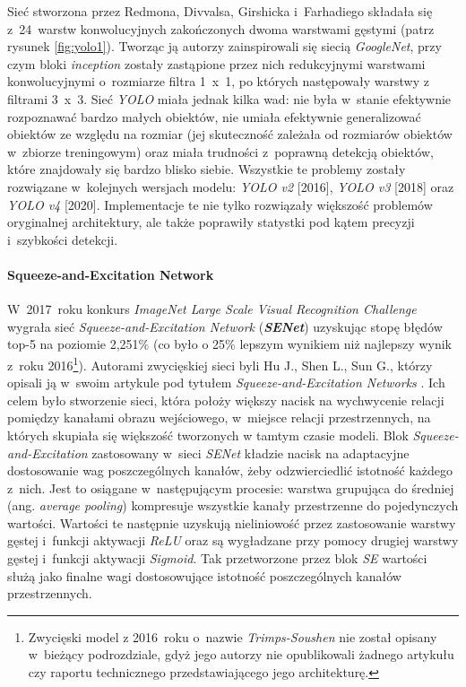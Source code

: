 Sieć stworzona przez Redmona, Divvalsa, Girshicka i~Farhadiego składała się z~24~warstw konwolucyjnych zakończonych dwoma warstwami gęstymi (patrz rysunek \ref{fig:yolo1}). Tworząc ją autorzy zainspirowali się siecią \emph{GoogleNet}, przy czym bloki \emph{inception} zostały zastąpione przez nich redukcyjnymi warstwami konwolucyjnymi  o~rozmiarze filtra 1~x~1, po których następowały warstwy z filtrami 3~x~3. Sieć \emph{YOLO} miała jednak kilka wad: nie była w~stanie efektywnie rozpoznawać bardzo małych obiektów, nie umiała efektywnie generalizować obiektów ze względu na rozmiar (jej skuteczność zależała od rozmiarów obiektów w~zbiorze treningowym) oraz miała trudności z~poprawną detekcją obiektów, które znajdowały się bardzo blisko siebie. Wszystkie te problemy zostały rozwiązane w~kolejnych wersjach modelu: \emph{YOLO v2} [2016], \emph{YOLO v3} [2018] oraz \emph{YOLO v4} [2020]. Implementacje te nie tylko rozwiązały większość problemów oryginalnej architektury, ale także poprawiły statystki pod kątem precyzji i~szybkości detekcji.

\paragraph*{Squeeze-and-Excitation Network}

W~2017~roku konkurs \emph{ImageNet Large Scale Visual Recognition Challenge} wygrała sieć \emph{Squeeze-and-Excitation Network} (\textbf{\emph{SENet}}) uzyskując stopę błędów top-5 na poziomie 2,251\% (co było o 25\% lepszym wynikiem niż najlepszy wynik z~roku 2016\footnote{Zwycięski model z 2016~roku o~nazwie \emph{Trimps-Soushen} nie został opisany w~bieżący podrozdziale, gdyż jego autorzy nie opublikowali żadnego artykułu czy raportu technicznego przedstawiającego jego architekturę.}). Autorami zwycięskiej sieci byli Hu J., Shen L., Sun G., którzy opisali ją w~swoim artykule pod tytułem \emph{Squeeze-and-Excitation Networks} \cite{hu}. Ich celem było stworzenie sieci, która położy większy nacisk na wychwycenie relacji pomiędzy kanałami obrazu wejściowego, w~miejsce relacji przestrzennych, na których skupiała się większość tworzonych w tamtym czasie modeli. Blok \emph{Squeeze-and-Excitation} zastosowany w~sieci \emph{SENet} kładzie nacisk na adaptacyjne dostosowanie wag poszczególnych kanałów, żeby odzwierciedlić istotność każdego z~nich. Jest to osiągane w~następującym procesie: warstwa grupująca do średniej (ang. \emph{average pooling}) kompresuje wszystkie kanały przestrzenne do pojedynczych wartości. Wartości te następnie uzyskują nieliniowość przez zastosowanie warstwy gęstej i~funkcji aktywacji \emph{ReLU} oraz są wygładzane przy pomocy drugiej warstwy gęstej i~funkcji aktywacji \emph{Sigmoid}. Tak przetworzone przez blok \emph{SE} wartości służą jako finalne wagi dostosowujące istotność poszczególnych kanałów przestrzennych.

